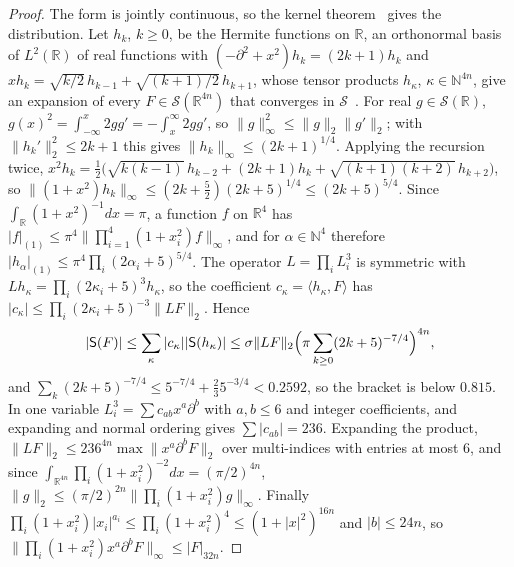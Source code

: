\documentclass[aps,prd,twocolumn,superscriptaddress,nofootinbib,longbibliography,floatfix,amsmath,amssymb,10pt]{revtex4-2}
\theoremstyle{definition}
\theoremstyle{remark}
\newcommand{\R}{\mathbb{R}}
\newcommand{\ip}[2]{\langle #1,#2\rangle}
\begin{document}
\begin{proof}
The form is jointly continuous, so the kernel
theorem~\cite[Sect.~V.3]{RS80} gives the distribution. Let $h_k$, $k\ge0$, be
the Hermite functions on $\R$, an orthonormal basis of $L^2(\R)$ of real
functions with $(-\partial^2+x^2)h_k=(2k+1)h_k$ and
$xh_k=\sqrt{k/2}\,h_{k-1}+\sqrt{(k+1)/2}\,h_{k+1}$, whose tensor products
$h_\kappa$, $\kappa\in\mathbb N^{4n}$, give an expansion of every
$F\in\mathcal S(\R^{4n})$ that converges in $\mathcal S$~\cite[Sect.~V.3]{RS80}.
For real $g\in\mathcal S(\R)$, $g(x)^2=\int_{-\infty}^x2gg'=-\int_x^\infty
2gg'$, so $\|g\|_\infty^2\le\|g\|_2\|g'\|_2$; with $\|h_k'\|_2^2\le2k+1$
this gives $\|h_k\|_\infty\le(2k+1)^{1/4}$. Applying the recursion twice,
$x^2h_k=\frac12\bigl(\sqrt{k(k-1)}\,h_{k-2}+(2k+1)h_k+\sqrt{(k+1)(k+2)}\,
h_{k+2}\bigr)$, so $\|(1+x^2)h_k\|_\infty\le(2k+\frac52)(2k+5)^{1/4}\le
(2k+5)^{5/4}$. Since $\int_\R(1+x^2)^{-1}dx=\pi$, a function $f$ on $\R^4$
has $|f|_{(1)}\le\pi^4\|\prod_{i=1}^4(1+x_i^2)f\|_\infty$, and for
$\alpha\in\mathbb N^4$ therefore $|h_\alpha|_{(1)}\le\pi^4\prod_i
(2\alpha_i+5)^{5/4}$. The operator $L=\prod_iL_i^3$ is symmetric with
$Lh_\kappa=\prod_i(2\kappa_i+5)^3h_\kappa$, so the coefficient
$c_\kappa=\ip{h_\kappa}F$ has $|c_\kappa|\le\prod_i(2\kappa_i+5)^{-3}
\|LF\|_2$. Hence
\[
|\mathsf S(F)|\le\sum_\kappa|c_\kappa||\mathsf S(h_\kappa)|
\le\sigma\|LF\|_2\Bigl(\pi\sum_{k\ge0}(2k+5)^{-7/4}\Bigr)^{4n},
\]
and $\sum_k(2k+5)^{-7/4}\le5^{-7/4}+\frac23 5^{-3/4}<0.2592$, so the bracket
is below $0.815$. In one variable $L_i^3=\sum c_{ab}x^a\partial^b$ with
$a,b\le6$ and integer coefficients, and expanding and normal ordering gives $\sum|c_{ab}|=236$. Expanding the product,
$\|LF\|_2\le236^{4n}\max\|x^a\partial^bF\|_2$ over multi-indices with
entries at most $6$, and since $\int_{\R^{4n}}\prod_i(1+x_i^2)^{-2}dx=
(\pi/2)^{4n}$, $\|g\|_2\le(\pi/2)^{2n}\|\prod_i(1+x_i^2)g\|_\infty$. Finally
$\prod_i(1+x_i^2)|x_i|^{a_i}\le\prod_i(1+x_i^2)^4\le(1+|x|^2)^{16n}$ and
$|b|\le24n$, so $\|\prod_i(1+x_i^2)x^a\partial^bF\|_\infty\le|F|_{32n}$.
\end{proof}
\end{document}
